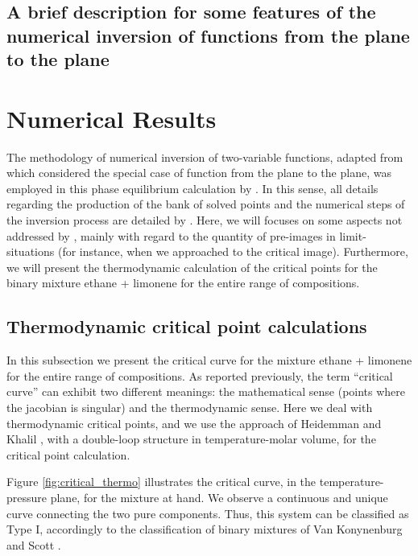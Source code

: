 \documentclass{article}
\theoremstyle{definition}
\theoremstyle{remark}
\begin{document}
\subsection{A brief description for some features of the numerical inversion of functions from the plane to the plane}

\section{Numerical Results}

The methodology of numerical inversion of two-variable functions, adapted from \cite{malta} which considered the special case of function from the plane to the plane,
 was employed in this phase equilibrium calculation by \cite{ireme}. In this sense, all details regarding the production of the bank of solved points and the numerical steps of the inversion process are detailed by \cite{ireme}. Here, we will focuses on some aspects not addressed by \cite{ireme}, mainly with regard
 to the quantity of pre-images in  limit-situations (for instance, when we approached to the critical image). Furthermore, we will present the thermodynamic calculation of the critical points for the binary mixture ethane + limonene for the entire range of compositions.
 
\subsection{Thermodynamic critical point calculations}

In this subsection we present the critical curve for the mixture ethane + limonene for the entire range of compositions. As reported previously, the term ``critical curve'' can exhibit two different meanings: the mathematical sense (points where the jacobian is 
singular) and the thermodynamic sense. Here we  deal
 with thermodynamic critical points, and  we use the approach of Heidemman and Khalil \cite{heidemman}, with a double-loop structure in temperature-molar volume, for the critical point calculation.

Figure \ref{fig:critical_thermo} illustrates the critical curve, in the temperature-pressure plane, for the mixture at hand. We observe a continuous and unique curve connecting the two pure components. Thus, this system can be classified as Type I, accordingly to the classification of binary mixtures of Van Konynenburg and Scott \cite{classif}.
\end{document}
